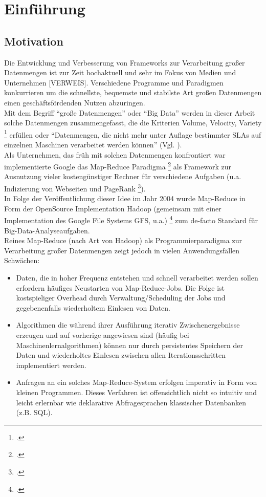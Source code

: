 \chapter{Einführung}

\section{Motivation}

Die Entwicklung und Verbesserung von Frameworks zur Verarbeitung großer Datenmengen ist zur Zeit hochaktuell und sehr im Fokus von Medien und Unternehmen [VERWEIS]. Verschiedene Programme und Paradigmen konkurrieren um die schnellste, bequemste und stabilste Art großen Datenmengen einen geschäftsfördenden Nutzen abzuringen.\\

Mit dem Begriff "`große Datenmengen"' oder "`Big Data"' werden in dieser Arbeit solche Datenmengen zusammengefasst, die die Kriterien Volume, Velocity, Variety \footcite{Lan01} erfüllen oder "`Datenmengen, die nicht mehr unter Auflage bestimmter SLAs auf einzelnen Maschinen verarbeitet werden können"' (Vgl. \cite{Sam14}).\\

Als Unternehmen, das früh mit solchen Datenmengen konfrontiert war implementierte Google das Map-Reduce Paradigma \footcite{Dean04} als Framework zur Ausnutzung vieler kostengünstiger Rechner für verschiedene Aufgaben (u.a.  Indizierung von Webseiten und PageRank \footcite{page2001method}). \\

In Folge der Veröffentlichung dieser Idee im Jahr 2004 wurde Map-Reduce in Form der OpenSource Implementation Hadoop (gemeinsam mit einer Implementation des Google File Systems GFS, u.a.) \footcite{Ghema03} zum de-facto Standard für Big-Data-Analyseaufgaben.\\

Reines Map-Reduce (nach Art von Hadoop) als Programmierparadigma zur Verarbeitung großer Datenmengen zeigt jedoch in vielen Anwendungsfällen Schwächen:
\begin{itemize}
	\item Daten, die in hoher Frequenz entstehen und schnell verarbeitet werden sollen erfordern häufiges Neustarten von Map-Reduce-Jobs. Die Folge ist kostspieliger Overhead durch Verwaltung/Scheduling der Jobs und gegebenenfalls wiederholtem Einlesen von Daten.
	\item Algorithmen die während ihrer Ausführung iterativ Zwischenergebnisse erzeugen und auf vorherige angewiesen sind (häufig bei Maschinenlernalgorithmen) können nur durch persistentes Speichern der Daten und wiederholtes Einlesen zwischen allen Iterationsschritten implementiert werden.
	\item Anfragen an ein solches Map-Reduce-System erfolgen imperativ in Form von kleinen Programmen. Dieses Verfahren ist offensichtlich nicht so intuitiv und leicht erlernbar wie deklarative Abfragesprachen klassischer Datenbanken (z.B. SQL).
\end{itemize}


